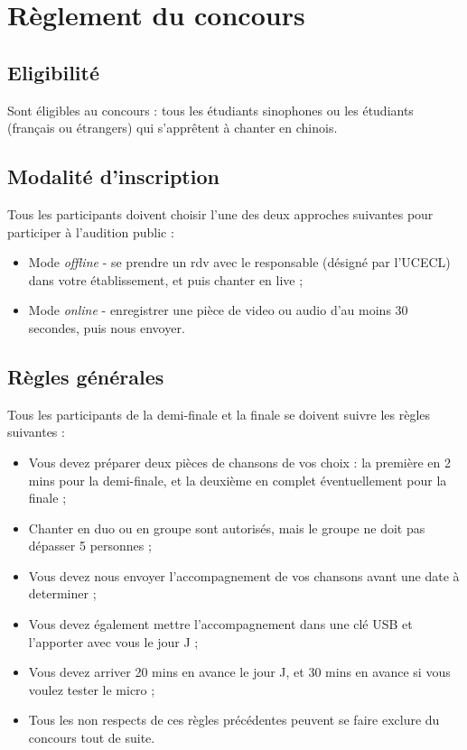 \documentclass[11pt,fleqn]{book} %
\begin{document}
\section{R\`eglement du concours}

\subsection{Eligibilit\'e}

Sont \'eligibles au concours : tous les \'etudiants sinophones ou les \'etudiants (fran\c cais ou \'etrangers) qui s'appr\^etent \`a chanter en chinois.

\subsection{Modalit\'e d'inscription}

Tous les participants doivent choisir l'une des deux approches suivantes pour participer \`a l'audition public :
\begin{itemize}[label=\textbullet]
    \item Mode \emph{offline} - se prendre un rdv avec le responsable (d\'esign\'e par l'UCECL) dans votre \'etablissement, et puis chanter en live ;
    \item Mode \emph{online} - enregistrer une pi\`ece de video ou audio d'au moins 30 secondes, puis nous envoyer.
\end{itemize}

\subsection{R\`egles g\'en\'erales}

Tous les participants de la demi-finale et la finale se doivent suivre les r\`egles suivantes :
\begin{itemize}[label=\textbullet]
    \item Vous devez pr\'eparer deux pi\`eces de chansons de vos choix : la premi\`ere en 2 mins pour la demi-finale, et la deuxi\`eme en complet \'eventuellement pour la finale ;
    \item Chanter en duo ou en groupe sont autoris\'es, mais le groupe ne doit pas d\'epasser 5 personnes ;
    \item Vous devez nous envoyer l'accompagnement de vos chansons avant une date \`a determiner ;
    \item Vous devez \'egalement mettre l'accompagnement dans une cl\'e USB et l'apporter avec vous le jour J ;
    \item Vous devez arriver 20 mins en avance le jour J, et 30 mins en avance si vous voulez tester le micro ;
    \item Tous les non respects de ces r\`egles pr\'ec\'edentes peuvent se faire exclure du concours tout de suite.
\end{itemize}
\end{document}
